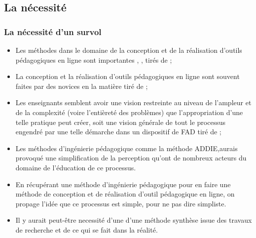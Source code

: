\subsection{La nécessité} 
		\begin{frame}[allowframebreaks]
			\frametitle{La nécessité d’un survol}
                        
                        \begin{itemize} 
                        \item  Les méthodes dans le domaine de la conception et de la réalisation d’outils pédagogiques en ligne sont importantes \citep[p. 842]{bohl2002a}, \citep[p. 218]{barry2003a}, \citep[p. 1]{hadjerrouit2007a} tirés de \cite{bonneau2013a};
                        \item La conception et la réalisation d’outils pédagogiques en ligne sont souvent faites par des novices en la matière \citep[p. 351]{verstegen2008a} tiré de \citet{bonneau2013a};
                        \item Les enseignants semblent avoir une vision restreinte au niveau de l’ampleur et de la complexité (voire l’entièreté des problèmes) que l’appropriation d’une telle pratique peut créer, soit une vision générale de tout le processus engendré par une telle démarche dans un dispositif de FAD \citep[p. 105]{roy2011a} tiré de \citet{bonneau2013a}; 
                        \item Les méthodes d’ingénierie pédagogique comme la méthode ADDIE,aurais provoqué une simplification de la perception qu’ont de nombreux acteurs du domaine de l’éducation de ce processus\citep[p.28]{bonneau2013a}. 
                        \item En récupérant une méthode d’ingénierie pédagogique pour en faire une méthode de conception et de réalisation d’outil pédagogique en ligne, on propage l’idée que ce processus est simple, pour ne pas dire simpliste\citep[p.29]{bonneau2013a}.
                        \item Il y aurait peut-être necessité d'une d’une méthode synthèse issue des travaux de recherche et de ce qui se fait dans la réalité.

                        \end{itemize}

             
                \end{frame}
                
